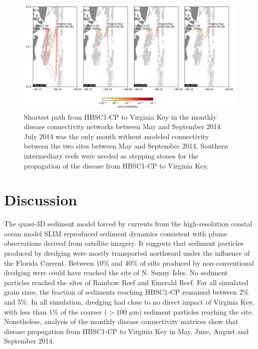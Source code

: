 \documentclass[preprint,12pt,authoryear]{elsarticle}
\begin{document}
\begin{figure}
    \centering
    \includegraphics[width=\textwidth]{figures/fig_paths.png}
    \caption{Shortest path from HBSC1-CP to Virginia Key in the monthly disease connectivity networks between May and September 2014. July 2014 was the only month without modeled connectivity between the two sites between May and September 2014. Southern intermediary reefs were needed as stepping stones for the propagation of the disease from HBSC1-CP to Virginia Key.}
    \label{fig:onset_path}
\end{figure}

\section{Discussion}
The quasi-3D sediment model forced by currents from the high-resolution coastal ocean model SLIM reproduced sediment dynamics consistent with plume observations derived from satellite imagery. It suggests that sediment particles produced by dredging were mostly transported northward under the influence of the Florida Current. Between 10\% and 40\% of silts produced by non-conventional dredging were could have reached the site of N. Sunny Isles. No sediment particles reached the sites of Rainbow Reef and Emerald Reef. For all simulated grain sizes, the fraction of sediments reaching HBSC1-CP remained between 2\% and 5\%. In all simulation, dredging had close to no direct impact of Virginia Key, with less than 1\% of the coarser ($> 100$ $\mu$m) sediment particles reaching the site. Nonetheless, analysis of the monthly disease connectivity matrices show that disease propagation from HBSC1-CP to Virginia Key in May, June, August and September 2014.
\end{document}
